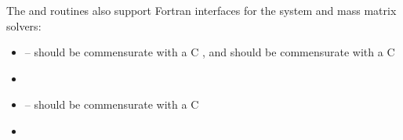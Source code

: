 The  and  routines also support
Fortran interfaces for the system and mass matrix solvers:
\begin{itemize}
\item {} -- 
  should be commensurate with a C , and 
  should be commensurate with a C 
\item {}
\item {} -- 
  should be commensurate with a C 
\item {}
\end{itemize}
